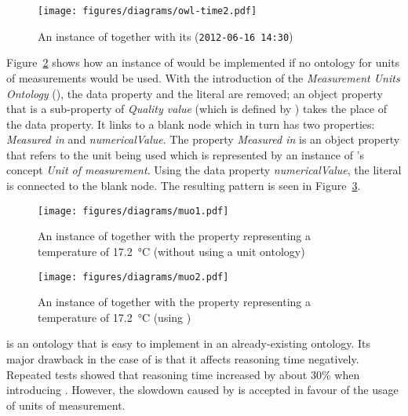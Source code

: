 \begin{figure}
  \centering
  \texttt{[image: figures/diagrams/owl-time2.pdf]}
  \caption{An instance of  together with its  (\texttt{2012-06-16~14:30})}
  \label{fig:owl_time2}
\end{figure}

\vspace{1em}

Figure~\ref{fig:muo1} shows how an instance of  would be implemented if no ontology for units of measurements would be used. With the introduction of the \emph{Measurement Units Ontology} (\muo), the data property and the literal are removed; an object property that is a sub-property of \emph{Quality value} (which is defined by \muo) takes the place of the data property. It links to a blank node which in turn has two properties: \emph{Measured in} and \emph{numericalValue}. The property \emph{Measured in} is an object property that refers to the unit being used which is represented by an instance of \muo's concept \emph{Unit of measurement}. Using the data property \emph{numericalValue}, the literal is connected to the blank node. The resulting pattern is seen in Figure~\ref{fig:muo2}.

\begin{figure}
  \centering
  \texttt{[image: figures/diagrams/muo1.pdf]}
  \caption{An instance of  together with the property  representing a temperature of \SI{17.2}{\celsius} (without using a unit ontology)}
  \label{fig:muo1}
\end{figure}

\begin{figure}
  \centering
  \texttt{[image: figures/diagrams/muo2.pdf]}
  \caption{An instance of  together with the property  representing a temperature of \SI{17.2}{\celsius} (using \muo)}
  \label{fig:muo2}
\end{figure}

\muo is an ontology that is easy to implement in an already-existing ontology. Its major drawback in the case of \smarthomeweather is that it affects reasoning time negatively. Repeated tests showed that reasoning time increased by about $30 \%$ when introducing \muo. However, the slowdown caused by \muo is accepted in favour of the usage of units of measurement.

\vspace{1em}

